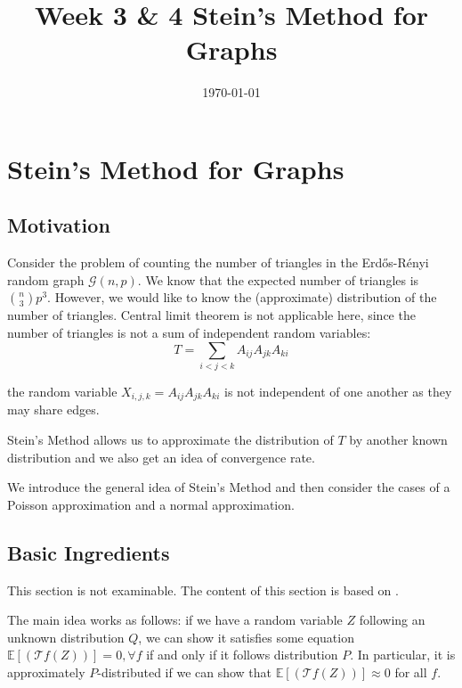 \documentclass{article}
\title{Week 3 \& 4 Stein's Method for Graphs}
\date{\today}
\begin{document}
\maketitle

\section{Stein's Method for Graphs}

\subsection{Motivation}
Consider the problem of counting the number of triangles in the Erd\H{o}s-R\'{e}nyi random graph $\mathcal{G}(n,p)$. We know that the expected number of triangles is $\binom{n}{3}p^3$. However, we would like to know the (approximate) distribution of the number of triangles. Central limit theorem is not applicable here, since the number of triangles is not a sum of independent random variables: 
\begin{equation*}
    T=\sum_{i<j<k} A_{ij}A_{jk}A_{ki}
\end{equation*}

the random variable $X_{i,j,k}=A_{ij}A_{jk}A_{ki}$ is not independent of one another as they may share edges.  

Stein's Method allows us to approximate the distribution of $T$ by another known distribution and we also get an idea of convergence rate.  

We introduce the general idea of Stein's Method and then consider the cases of a Poisson approximation and a normal approximation.

\subsection{Basic Ingredients}

\begin{unexaminable}
    This section is not examinable. The content of this section is based on \citep{anastasiou2022steins}.
\end{unexaminable}

The main idea works as follows: if we have a random variable $Z$ following an unknown distribution $Q$, we can show it satisfies some equation $\mathbb{E}[(\mathcal{T}f (Z))]=0, \forall f$ if and only if it follows distribution $P$. In particular, it is approximately $P$-distributed if we can show that $\mathbb{E}[(\mathcal{T}f (Z))]\approx 0$ for all $f$.  
\end{document}

